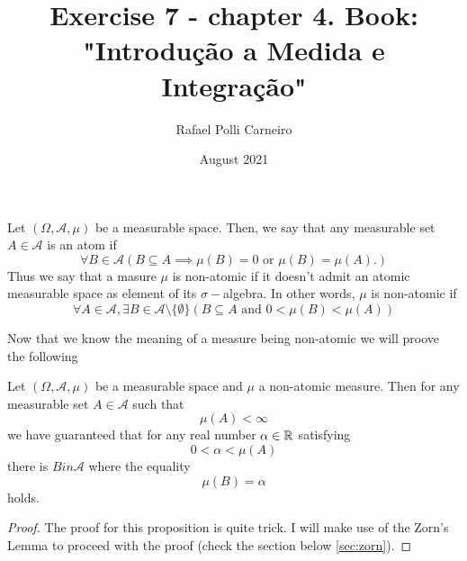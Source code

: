 \documentclass[11pt,twoside,a4paper]{article}
\title{Exercise 7 - chapter 4. Book: "Introdução a Medida e Integração"}
\author{Rafael Polli Carneiro}
\date{August 2021}
\begin{document}
\maketitle

\begin{definition}
    Let $(\Omega, \mathcal{A}, \mu)$ be a measurable space. Then, we say that 
    any measurable set $A \in \mathcal{A}$ is an atom if
    \begin{equation*}
        \forall B \in \mathcal{A}
        \left( 
            B \subseteq A \implies \mu(B) = 0 \text{ or } \mu(B) = \mu(A).
        \right)
    \end{equation*}
    Thus we say that a masure $\mu$ is non-atomic if it doesn't admit an
    atomic measurable space as element of its $\sigma-$algebra. In other
    words, $\mu$ is non-atomic if
    \begin{equation*}
        \forall A \in \mathcal{A},
        \exists B \in \mathcal{A}\setminus\{\emptyset\}
        \left(
        B \subseteq A \text{ and } 0 < \mu(B) < \mu(A)
        \right)
    \end{equation*}
\end{definition}

Now that we know the meaning of a measure being non-atomic we will proove
the following
\begin{proposition}
    Let $(\Omega, \mathcal{A},\mu)$ be a measurable space and
    $\mu$ a non-atomic measure. Then for any measurable set $A \in \mathcal{A}$    
    such that
    \begin{equation*}
        \mu(A)  < \infty
    \end{equation*}
    we have guaranteed that for any real number $\alpha \in \operatorname{\mathbb{R}}$
    satisfying
    \begin{equation*}
        0 < \alpha < \mu(A)        
    \end{equation*}
    there is $B in \mathcal{A}$ where the equality
    \begin{equation*}
        \mu(B)  = \alpha
    \end{equation*}
    holds.
\end{proposition}
\begin{proof}
    The proof for this proposition is quite trick. I will make use of the
    Zorn's Lemma to proceed with the proof 
    (check the section below \ref{sec:zorn}).
\end{proof}
\end{document}
